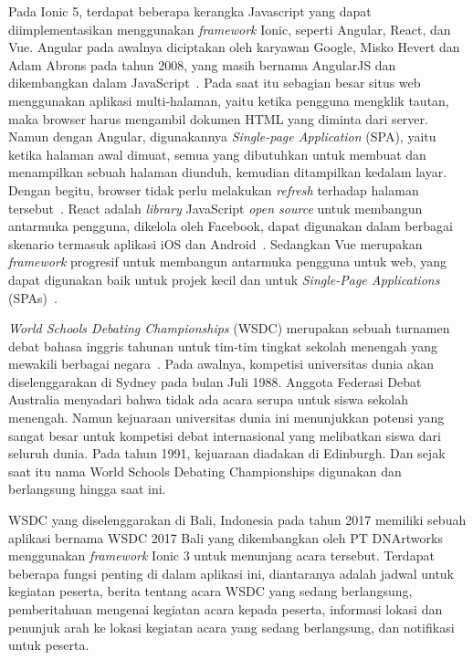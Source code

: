 Pada Ionic 5, terdapat beberapa kerangka Javascript yang dapat diimplementasikan menggunakan \textit{framework} Ionic, seperti Angular, React, dan Vue. Angular pada awalnya diciptakan oleh karyawan Google, Misko Hevert dan Adam Abrons pada tahun 2008, yang masih bernama AngularJS dan dikembangkan dalam JavaScript~\cite{wohlgethan:18:supporting}. Pada saat itu sebagian besar situs web menggunakan aplikasi multi-halaman, yaitu ketika pengguna mengklik tautan, maka browser harus mengambil dokumen HTML yang diminta dari server. Namun dengan Angular, digunakannya \textit{Single-page Application} (SPA), yaitu ketika halaman awal dimuat, semua yang dibutuhkan untuk membuat dan menampilkan sebuah halaman diunduh, kemudian ditampilkan kedalam layar. Dengan begitu, browser tidak perlu melakukan \textit{refresh} terhadap halaman tersebut~\cite{scott:15:spa}. React adalah \textit{library} JavaScript {\it open source} untuk membangun antarmuka pengguna, dikelola oleh Facebook, dapat digunakan dalam berbagai skenario termasuk aplikasi iOS dan Android~\cite{wohlgethan:18:supporting}. Sedangkan Vue merupakan \textit{framework}  progresif untuk membangun antarmuka pengguna untuk web, yang dapat digunakan baik untuk projek kecil dan untuk {\it Single-Page Applications} (SPAs)~\cite{wohlgethan:18:supporting}.

\textit{World Schools Debating Championships} (WSDC) merupakan sebuah turnamen debat bahasa inggris tahunan untuk tim-tim tingkat sekolah menengah yang mewakili berbagai negara~\cite{wsdc}. Pada awalnya, kompetisi universitas dunia akan diselenggarakan di Sydney pada bulan Juli 1988. Anggota Federasi Debat Australia menyadari bahwa tidak ada acara serupa untuk siswa sekolah menengah. Namun kejuaraan universitas dunia ini menunjukkan potensi yang sangat besar untuk kompetisi debat internasional yang melibatkan siswa dari seluruh dunia. Pada tahun 1991, kejuaraan diadakan di Edinburgh. Dan sejak saat itu nama World Schools Debating Championships digunakan dan berlangsung hingga saat ini. 

WSDC yang diselenggarakan di Bali, Indonesia pada tahun 2017 memiliki sebuah aplikasi bernama WSDC 2017 Bali yang dikembangkan oleh PT DNArtworks menggunakan \textit{framework} Ionic 3 untuk menunjang acara tersebut. Terdapat beberapa fungsi penting di dalam aplikasi ini, diantaranya adalah jadwal untuk kegiatan peserta, berita tentang acara WSDC yang sedang berlangsung, pemberitahuan mengenai kegiatan acara kepada peserta, informasi lokasi dan penunjuk arah ke lokasi kegiatan acara yang sedang berlangsung, dan notifikasi untuk peserta. 

